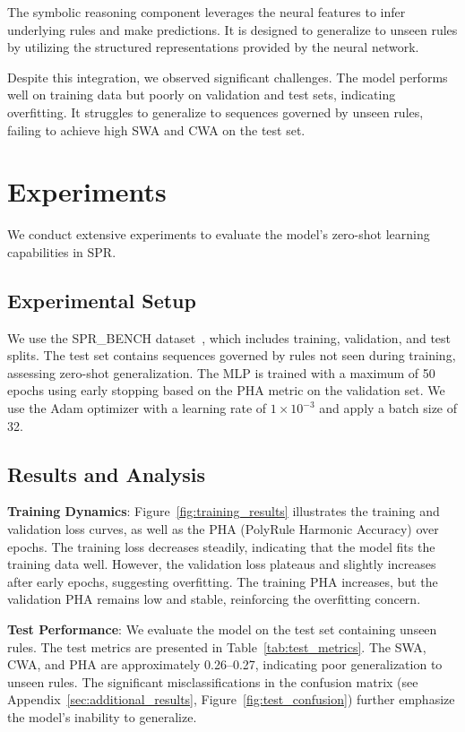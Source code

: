 \documentclass{article} %
\begin{document}
The symbolic reasoning component leverages the neural features to infer underlying rules and make predictions. It is designed to generalize to unseen rules by utilizing the structured representations provided by the neural network.

Despite this integration, we observed significant challenges. The model performs well on training data but poorly on validation and test sets, indicating overfitting. It struggles to generalize to sequences governed by unseen rules, failing to achieve high SWA and CWA on the test set.

\section{Experiments}
\label{sec:experiments}

We conduct extensive experiments to evaluate the model's zero-shot learning capabilities in SPR.

\subsection{Experimental Setup}

We use the SPR\_BENCH dataset~\cite{lorello2024thekb}, which includes training, validation, and test splits. The test set contains sequences governed by rules not seen during training, assessing zero-shot generalization. The MLP is trained with a maximum of 50 epochs using early stopping based on the PHA metric on the validation set. We use the Adam optimizer with a learning rate of $1 \times 10^{-3}$ and apply a batch size of 32.

\subsection{Results and Analysis}

\textbf{Training Dynamics}: Figure~\ref{fig:training_results} illustrates the training and validation loss curves, as well as the PHA (PolyRule Harmonic Accuracy) over epochs. The training loss decreases steadily, indicating that the model fits the training data well. However, the validation loss plateaus and slightly increases after early epochs, suggesting overfitting. The training PHA increases, but the validation PHA remains low and stable, reinforcing the overfitting concern.

\textbf{Test Performance}: We evaluate the model on the test set containing unseen rules. The test metrics are presented in Table~\ref{tab:test_metrics}. The SWA, CWA, and PHA are approximately 0.26--0.27, indicating poor generalization to unseen rules. The significant misclassifications in the confusion matrix (see Appendix~\ref{sec:additional_results}, Figure~\ref{fig:test_confusion}) further emphasize the model's inability to generalize.
\end{document}
